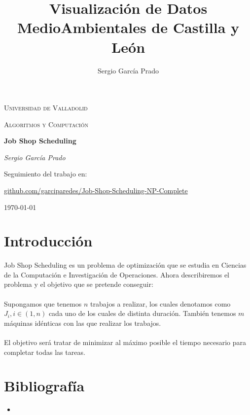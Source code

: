 \documentclass[11pt, a4paper,spanish]{article}
\title{Visualización de Datos MedioAmbientales de Castilla y León}
\author{Sergio García Prado}
\begin{document}
	\begin{titlepage}
		\centering
		{\scshape\LARGE Universidad de Valladolid \par}
		
		\vspace{1cm}
		{\scshape\Large Algoritmos y Computación\par}
		
		\vspace{1.5cm}
		{\huge\bfseries Job Shop Scheduling\par}
		
		\vspace{2cm}
		{\Large\itshape Sergio García Prado\par}

		\vfill
		Seguimiento del trabajo en: \par
		\href{https://github.com/garciparedes/Job-Shop-Scheduling-NP-Complete}{github.com/garciparedes/Job-Shop-Scheduling-NP-Complete}
		\vfill

		{\large \today\par}
	\end{titlepage}

	\newpage
		\tableofcontents
	\newpage
	
		\section{Introducción}
			
			\paragraph{}
			Job Shop Scheduling es un problema de optimización que se estudia en Ciencias de la Computación e Investigación de Operaciones. Ahora describiremos el problema y el objetivo que se pretende conseguir:
			
			\paragraph{}
			Supongamos que tenemos $n$ trabajos a realizar, los cuales denotamos como $J_{i}, i \in (1,n)$ cada uno de los cuales de distinta duración. También tenemos $m$ máquinas idénticas con las que realizar los trabajos.
			
			\paragraph{}
			El objetivo será tratar de minimizar al máximo posible el tiempo necesario para completar todas las tareas.
	
	
	
	\newpage

		\section{Bibliografía}

			\begin{itemize}
			
				\item
		
			\end{itemize}
\end{document}
